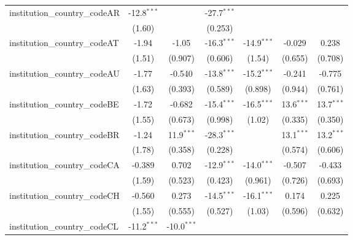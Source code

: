 \begin{tabular}{lcccccc}
   institution\_country\_codeAR          & -12.8$^{***}$ &               & -27.7$^{***}$ &               &               &   \\   
                                         & (1.60)        &               & (0.253)       &               &               &   \\   
   institution\_country\_codeAT          & -1.94         & -1.05         & -16.3$^{***}$ & -14.9$^{***}$ & -0.029        & 0.238\\   
                                         & (1.51)        & (0.907)       & (0.606)       & (1.54)        & (0.655)       & (0.708)\\   
   institution\_country\_codeAU          & -1.77         & -0.540        & -13.8$^{***}$ & -15.2$^{***}$ & -0.241        & -0.775\\   
                                         & (1.63)        & (0.393)       & (0.589)       & (0.898)       & (0.944)       & (0.761)\\   
   institution\_country\_codeBE          & -1.72         & -0.682        & -15.4$^{***}$ & -16.5$^{***}$ & 13.6$^{***}$  & 13.7$^{***}$\\   
                                         & (1.55)        & (0.673)       & (0.998)       & (1.02)        & (0.335)       & (0.350)\\   
   institution\_country\_codeBR          & -1.24         & 11.9$^{***}$  & -28.3$^{***}$ &               & 13.1$^{***}$  & 13.2$^{***}$\\   
                                         & (1.78)        & (0.358)       & (0.228)       &               & (0.574)       & (0.606)\\   
   institution\_country\_codeCA          & -0.389        & 0.702         & -12.9$^{***}$ & -14.0$^{***}$ & -0.507        & -0.433\\   
                                         & (1.59)        & (0.523)       & (0.423)       & (0.961)       & (0.726)       & (0.693)\\   
   institution\_country\_codeCH          & -0.560        & 0.273         & -14.5$^{***}$ & -16.1$^{***}$ & 0.174         & 0.225\\   
                                         & (1.55)        & (0.555)       & (0.527)       & (1.03)        & (0.596)       & (0.632)\\   
   institution\_country\_codeCL          & -11.2$^{***}$ & -10.0$^{***}$ &               &               &               &   \\   

\end{tabular}
